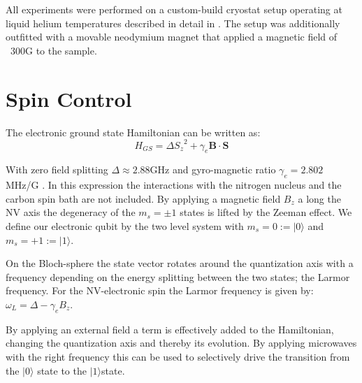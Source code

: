 All experiments were performed on a custom-build cryostat setup operating at liquid helium temperatures described in detail in \citet[chap.~3]{Bernien2014Control}. The setup was additionally outfitted with a movable neodymium magnet that applied a magnetic field of ~300G to the sample.

\section{Spin Control}
\label{spincontrol}

The electronic ground state Hamiltonian can be written as\citep{Pfaff2013Quantum}: 
 \begin{equation}
H_{GS} = \Delta {S_z}^2 + \gamma_e \mathbf{B} \cdot \mathbf{S}
\end{equation}

With zero field splitting $\Delta \approx 2.88 \mathrm{GHz}$  and gyro-magnetic ratio $\gamma_e  = 2.802$ MHz/G . In this expression the interactions with the nitrogen nucleus and the carbon spin bath are not included. By applying a magnetic field $B_z$ a long the NV axis the degeneracy of the  $m_s =\pm1$ states is lifted by the Zeeman effect. We define our electronic qubit  by the two level system with  $m_s=0:=|0\rangle$ and $m_s = +1 := |1\rangle$.

On the Bloch-sphere the state vector rotates around the quantization axis with a frequency depending on the energy splitting between the two states; the Larmor frequency.
For the NV-electronic spin the Larmor frequency is given by:  $\omega_L =\Delta - \gamma_e {B_z} $.

By applying an external field a term is effectively added to the Hamiltonian, changing the quantization axis and thereby its evolution. By applying microwaves with the right frequency this can be used to selectively drive the transition from the  $|0\rangle$ state to the $|1\rangle$state\citep{Jelezko2004Observation}.

